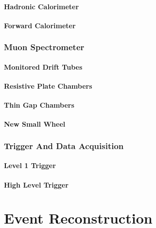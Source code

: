 \documentclass{umassthesis}          %
\begin{document}
\subsubsection{Hadronic Calorimeter}\label{sec:atlas_had_calorimeter}
 
\subsubsection{Forward Calorimeter}\label{sec:atlas_fcal}


\subsection{Muon Spectrometer}\label{sec:atlas_muon}

\subsubsection{Monitored Drift Tubes}\label{sec:atlas_mdt}

\subsubsection{Resistive Plate Chambers}\label{sec:atlas_rpc}

\subsubsection{Thin Gap Chambers}\label{sec:atlas_tgc}

\subsubsection{New Small Wheel}\label{sec:atlas_nsw}


\subsection{Trigger And Data Acquisition}\label{sec:atlas_trigger}
\subsubsection{Level 1 Trigger}\label{sec:atlas_l1_trigger}

\subsubsection{High Level Trigger}\label{sec:atlas_hlt}


\chapter{Event Reconstruction}\label{ch:reco}
\label{sec:reco_intro}
\end{document}
